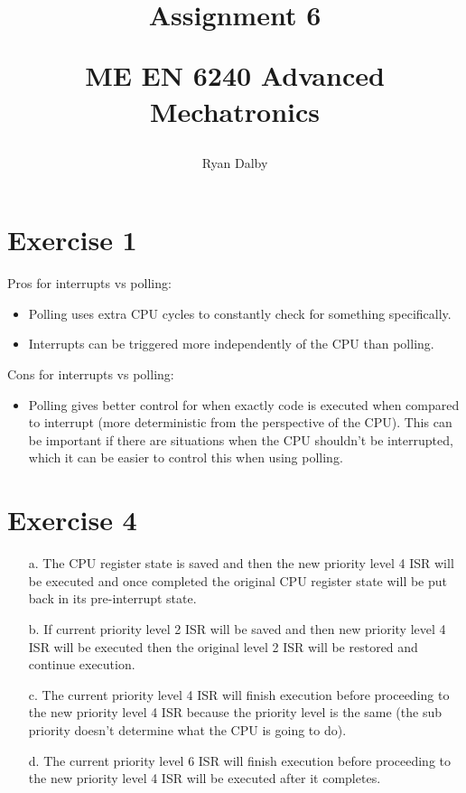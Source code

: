 \documentclass[12pt]{article}
\title{
    Assignment 6 

    \large{
        ME EN 6240 Advanced Mechatronics
    }  
}
\author{
        Ryan Dalby
}
\date{\displaydate{date}}
\begin{document}
\maketitle

\section*{Exercise 1}
Pros for interrupts vs polling:
\begin{itemize}
    \item 
    Polling uses extra CPU cycles to constantly check for something specifically.
    \item 
    Interrupts can be triggered more independently of the CPU than polling.
\end{itemize}

\begin{flushleft}
Cons for interrupts vs polling:
\end{flushleft}
\begin{itemize}
    \item 
    Polling gives better control for when exactly code is executed when compared to interrupt (more deterministic from the perspective of the CPU). 
    This can be important if there are situations when the CPU shouldn't be interrupted, which it can be easier to control this when using polling.
\end{itemize}

\section*{Exercise 4}
\begin{itemize}
    \item[a.] 
    The CPU register state is saved and then the new priority level 4 ISR will be executed and once completed the original CPU register state will be put back in its pre-interrupt state.

    \item[b.] 
    If current priority level 2 ISR will be saved and then new priority level 4 ISR will be executed then the original level 2 ISR will be restored and continue execution.

    \item[c.] 
    The current priority level 4 ISR will finish execution before proceeding to the new priority level 4 ISR because the priority level is the same (the sub priority doesn't determine what the CPU is going to do).

    \item[d.] 
    The current priority level 6 ISR will finish execution before proceeding to the new priority level 4 ISR will be executed after it completes.
\end{itemize}
\end{document}
